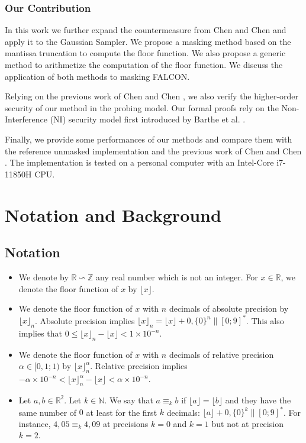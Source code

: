 \documentclass[runningheads]{llncs}
\begin{document}
\subsubsection{Our Contribution}
In this work we further expand the countermeasure from Chen and Chen \cite{Chen_Chen_2024} and apply it to the Gaussian Sampler. We propose a masking method based on the mantissa truncation to compute the floor function. We also propose a generic method to arithmetize the computation of the floor function. We discuss the application of both methods to masking FALCON.

\medskip

Relying on the previous work of Chen and Chen \cite{Chen_Chen_2024}, we also verify the higher-order security of our method in the probing model. Our formal proofs rely on the Non-Interference (NI) security model first introduced by Barthe et al. \cite{10.1145/2976749.2978427}.

\medskip

Finally, we provide some performances of our methods and compare them with the reference unmasked implementation and the previous work of Chen and Chen \cite{Chen_Chen_2024}. The implementation is tested on a personal computer with an Intel-Core i7-11850H CPU.
%
\section{Notation and Background}\label{sec:background}
\subsection{Notation}
\begin{itemize}
  \item We denote by $\mathbb{R}\backsim \mathbb{Z}$ any real number which is not an integer. For $x\in\mathbb{R}$, we denote the floor function of $x$ by $\lfloor x \rfloor$.
  \item We denote the floor function of $x$ with $n$ decimals of absolute precision by $\lfloor x \rfloor_n$. Absolute precision implies $\lfloor x\rfloor_n = \lfloor x \rfloor + 0,\{0\}^n\|[0;9]^*$. This also implies that $0 \leq \lfloor x \rfloor_n - \lfloor x \rfloor < 1\times 10^{-n}$.
  \item We denote the floor function of $x$ with $n$ decimals of relative precision $\alpha\in[0,1;1)$ by $\lfloor x \rfloor_n^\alpha$. Relative precision implies $-\alpha\times 10^{-n} < \lfloor x \rfloor_n^\alpha - \lfloor x \rfloor < \alpha\times 10^{-n}$.
  \item Let $a,b\in\mathbb{R}^2$. Let $k\in\mathbb{N}$. We say that $a\equiv_k b$ if $\lfloor a\rfloor = \lfloor b \rfloor$ and they have the same number of $0$ at least for the first $k$ decimals: $\lfloor a \rfloor + 0,\{0\}^k\|[0;9]^*$. For instance, $4,05 \equiv_k 4,09$ at precisions $k=0$ and $k=1$ but not at precision $k=2$.
\end{itemize}
% 
\end{document}
